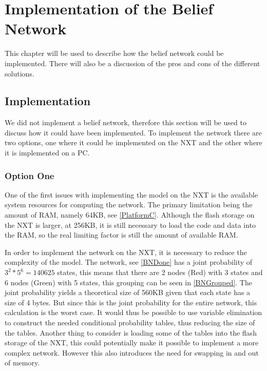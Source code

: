 \chapter{Implementation of the Belief Network}
This chapter will be used to describe how the belief network could be
implemented. There will also be a discussion of the pros and cons of the
different solutions.

\section{Implementation}
We did not implement a belief network, therefore this section will be used to
discuss how it could have been implemented. To implement the network there are
two options, one where it could be implemented on the NXT and the other where it is
implemented on a PC.

%

\subsection{Option One}
One of the first issues with implementing the model on the NXT is the available
system resources for computing the network. The primary limitation being the
amount of RAM, namely 64KB, see \autoref{PlatformC}. Although the flash storage
on the NXT is larger, at 256KB, it is still necessary to load the code and data
into the RAM, so the real limiting factor is still the amount of available
RAM.\nl

In order to implement the network on the NXT, it is necessary to reduce
the complexity of the model. The network, see \autoref{BNDone} has a joint
probability of $3^2*5^6 = 140625$ states, this means that there are 2 nodes (Red)
with 3 states and 6 nodes (Green) with 5 states, this grouping can be seen in
\autoref{BNGrouped}. The joint probability yields a theoretical size of 560KB given that each state has a size of 4 bytes. But since this is the joint
probability for the entire network, this calculation is the worst case. It
would thus be possible to use variable elimination to construct the needed
conditional probability tables, thus reducing the size of the tables. Another
thing to consider is loading some of the tables into the flash storage of the NXT, this could potentially make it possible to implement a more
complex network. However this also introduces the need for swapping in and out
of memory.\nl

